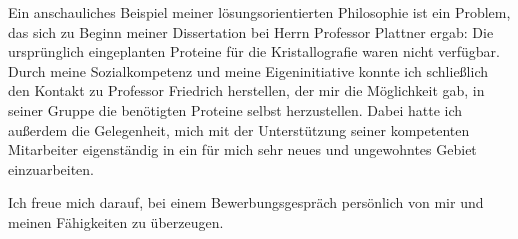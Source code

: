 \par 

Ein anschauliches Beispiel meiner lösungsorientierten Philosophie ist ein Problem, das sich zu Beginn meiner Dissertation bei Herrn Professor Plattner ergab: Die ursprünglich eingeplanten Proteine für die Kristallografie waren nicht verfügbar. Durch meine Sozialkompetenz und meine Eigeninitiative konnte ich schließlich den Kontakt zu Professor Friedrich herstellen, der mir die Möglichkeit gab, in seiner Gruppe die benötigten Proteine selbst herzustellen. Dabei hatte ich außerdem die Gelegenheit, mich mit der Unterstützung seiner kompetenten Mitarbeiter eigenständig in ein für mich sehr neues und ungewohntes Gebiet einzuarbeiten.\par


Ich freue mich darauf,  bei einem Bewerbungsgespräch persönlich von mir und meinen Fähigkeiten zu überzeugen.
\par\vspace{0.25em}

